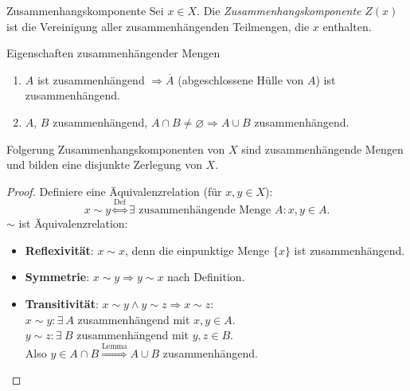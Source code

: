\begin{definition}{Zusammenhangskomponente}
  Sei $ x \in X $. Die \emph{Zusammenhangskomponente} $ Z(x) $ ist die Vereinigung aller zusammenhängenden Teilmengen, die $ x $ enthalten.
\end{definition}

\begin{lemma}{Eigenschaften zusammenhängender Mengen}
  \begin{enumerate}
    \item $ A $ ist zusammenhängend $ \Rightarrow \overline{A} $ (abgeschlossene Hülle von $ A $) ist zusammenhängend.
    \item $ A $, $ B $ zusammenhängend, $ A \cap B \neq \varnothing \Rightarrow A \cup B $ zusammenhängend. 
  \end{enumerate}
\end{lemma}

\begin{bla}{Folgerung}
  Zusammenhangskomponenten von $ X $ sind zusammenhängende Mengen und bilden eine disjunkte Zerlegung von $ X $.
  \begin{proof}
    Definiere eine Äquivalenzrelation (für $ x, y \in X $):
    \begin{equation*}
      x \sim y \overset{\text{Def}}{\Leftrightarrow} \exists \text{ zusammenhängende Menge } A : x, y \in A\text{.}
    \end{equation*}
    $ \sim $ ist Äquivalenzrelation:
    \begin{itemize}
      \item \textbf{Reflexivität}: $ x \sim x $, denn die einpunktige Menge $ \{ x \} $ ist zusammenhängend. 
      \item \textbf{Symmetrie}: $ x \sim y \Rightarrow y \sim x $ nach Definition.
      \item \textbf{Transitivität}: $ x \sim y \wedge y \sim z \Rightarrow x \sim z $: \\
        $ x \sim y: \exists \ A $ zusammenhängend mit $ x,y \in A $. \\
        $ y \sim z: \exists \ B $ zusammenhängend mit $ y,z \in B $. \\
        Also $ y \in A \cap B \overset{\text{Lemma}}{\Rightarrow} A \cup B $ zusammenhängend.
    \end{itemize}
  \end{proof}
\end{bla}

